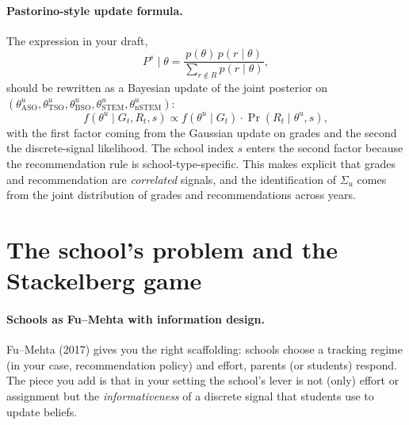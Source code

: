 \documentclass{article}
\begin{document}
\paragraph{Pastorino-style update formula.}  The expression in your draft,
\[
  P^{s}\mid \theta = \frac{p(\theta)\, p(r\mid \theta)}{\sum_{r\notin R}p(r\mid \theta)},
\]
should be rewritten as a Bayesian update of the joint posterior on
$(\theta^u_{\text{ASO}}, \theta^u_{\text{TSO}}, \theta^u_{\text{BSO}},
\theta^u_{\text{STEM}}, \theta^u_{\text{nSTEM}})$:
\[
  f(\theta^u\mid G_t, R_t, s) \propto f(\theta^u\mid G_t)\cdot
  \Pr(R_t\mid \theta^u, s),
\]
with the first factor coming from the Gaussian update on grades and the second
the discrete-signal likelihood. The school index $s$ enters the second factor
because the recommendation rule is school-type-specific.  This makes
explicit that grades and recommendation are \emph{correlated} signals, and the
identification of $\Sigma_u$ comes from the joint distribution of grades and
recommendations across years.

\section{The school's problem and the Stackelberg game}

\paragraph{Schools as Fu--Mehta with information design.}  Fu--Mehta (2017)
gives you the right scaffolding: schools choose a tracking regime (in your
case, recommendation policy) and effort, parents (or students) respond. The
piece you add is that in your setting the school's lever is not (only) effort
or assignment but the \emph{informativeness} of a discrete signal that
students use to update beliefs.
\end{document}
